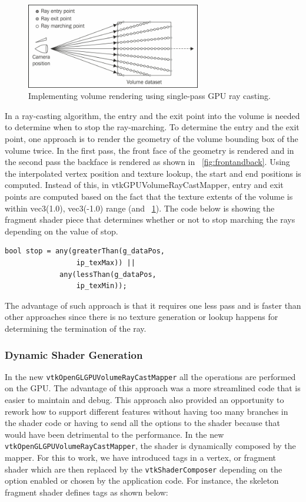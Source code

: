 \begin{figure}
\centering
\includegraphics[width=3in]{raycasting.jpg}
\caption{Implementing volume rendering using single-pass GPU ray casting.}
\label{fig:raycasting}
\end{figure}

In a ray-casting algorithm, the entry and the exit point into the volume is needed to determine when to stop the ray-marching. To determine the entry and the exit point, one approach is to render the geometry of the volume bounding box of the volume twice. In the first pass, the front face of the geometry is rendered and in the second pass the backface is rendered as shown in ~\ref{fig:frontandback}. Using the interpolated vertex position and texture lookup, the start and end positions is computed. Instead of this, in vtkGPUVolumeRayCastMapper, entry and exit points are computed based on the fact that the texture extents of the volume is within vec3(1.0), vec3(-1.0) range (and ~\ref{fig:raycasting}). The code below is showing the fragment shader piece that determines whether or not to stop marching the rays depending on the value of stop.
 
 \begin{lstlisting}[breaklines=true]
 bool stop = any(greaterThan(g_dataPos, 
                 ip_texMax)) ||
             any(lessThan(g_dataPos, 
                 ip_texMin));
 \end{lstlisting}
 
 The advantage of such approach is that it requires one less pass and is faster than other approaches since there is no texture generation or lookup happens for determining the termination of the ray.
 
 
\subsubsection{Dynamic Shader Generation}
In the new \texttt{vtkOpenGLGPUVolumeRayCastMapper} all the operations are performed on the GPU. The advantage of this approach was a more streamlined code that is easier to maintain and debug. This approach also provided an opportunity to rework how to support different features without having too many branches in the shader code or having to send all the options to the shader because that would have been detrimental to the performance. In the new \texttt{vtkOpenGLGPUVolumeRayCastMapper}, the shader is dynamically composed by the mapper. For this to work, we have introduced tags in a vertex, or fragment shader which are then replaced by the \texttt{vtkShaderComposer} depending on the option enabled or chosen by the application code. For instance, the skeleton fragment shader defines tags as shown below:
 
